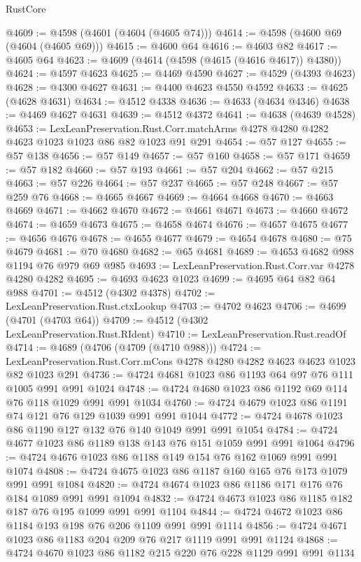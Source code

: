 \begin{lexlean}{RustCore}
\begin{coremodule}
@4609 := @4598 (@4601 (@4604 (@4605 @74)))
@4614 := @4598 (@4600 @69 (@4604 (@4605 @69)))
@4615 := @4600 @64
@4616 := @4603 @82
@4617 := @4605 @64
@4623 := @4609 (@4614 (@4598 (@4615 (@4616 @4617)) @4380))
@4624 := @4597 @4623
@4625 := @4469 @4590
@4627 := @4529 (@4393 @4623)
@4628 := @4300 @4627
@4631 := @4400 @4623 @4550 @4592
@4633 := @4625 (@4628 @4631)
@4634 := @4512 @4338
@4636 := @4633 (@4634 @4346)
@4638 := @4469 @4627 @4631
@4639 := @4512 @4372
@4641 := @4638 (@4639 @4528)
@4653 := LexLeanPreservation.Rust.Corr.matchArms
    @4278
    @4280
    @4282
    @4623
    @1023
    @1023
    @86
    @82
    @1023
    @91
    @291
@4654 := @57 @127
@4655 := @57 @138
@4656 := @57 @149
@4657 := @57 @160
@4658 := @57 @171
@4659 := @57 @182
@4660 := @57 @193
@4661 := @57 @204
@4662 := @57 @215
@4663 := @57 @226
@4664 := @57 @237
@4665 := @57 @248
@4667 := @57 @259 @76
@4668 := @4665 @4667
@4669 := @4664 @4668
@4670 := @4663 @4669
@4671 := @4662 @4670
@4672 := @4661 @4671
@4673 := @4660 @4672
@4674 := @4659 @4673
@4675 := @4658 @4674
@4676 := @4657 @4675
@4677 := @4656 @4676
@4678 := @4655 @4677
@4679 := @4654 @4678
@4680 := @75 @4679
@4681 := @70 @4680
@4682 := @65 @4681
@4689 := @4653 @4682 @988 @1194 @76 @979 @69 @985
@4693 := LexLeanPreservation.Rust.Corr.var @4278 @4280 @4282
@4695 := @4693 @4623 @1023
@4699 := @4695 @64 @82 @64 @988
@4701 := @4512 (@4302 @4378)
@4702 := LexLeanPreservation.Rust.ctxLookup
@4703 := @4702 @4623
@4706 := @4699 (@4701 (@4703 @64))
@4709 := @4512 (@4302 LexLeanPreservation.Rust.RIdent)
@4710 := LexLeanPreservation.Rust.readOf
@4714 := @4689 (@4706 (@4709 (@4710 @988)))
@4724 := LexLeanPreservation.Rust.Corr.mCons @4278 @4280 @4282 @4623 @4623 @1023 @82 @1023 @291
@4736 := @4724 @4681 @1023 @86 @1193 @64 @97 @76 @111 @1005 @991 @991 @1024
@4748 := @4724 @4680 @1023 @86 @1192 @69 @114 @76 @118 @1029 @991 @991 @1034
@4760 := @4724 @4679 @1023 @86 @1191 @74 @121 @76 @129 @1039 @991 @991 @1044
@4772 := @4724 @4678 @1023 @86 @1190 @127 @132 @76 @140 @1049 @991 @991 @1054
@4784 := @4724 @4677 @1023 @86 @1189 @138 @143 @76 @151 @1059 @991 @991 @1064
@4796 := @4724 @4676 @1023 @86 @1188 @149 @154 @76 @162 @1069 @991 @991 @1074
@4808 := @4724 @4675 @1023 @86 @1187 @160 @165 @76 @173 @1079 @991 @991 @1084
@4820 := @4724 @4674 @1023 @86 @1186 @171 @176 @76 @184 @1089 @991 @991 @1094
@4832 := @4724 @4673 @1023 @86 @1185 @182 @187 @76 @195 @1099 @991 @991 @1104
@4844 := @4724 @4672 @1023 @86 @1184 @193 @198 @76 @206 @1109 @991 @991 @1114
@4856 := @4724 @4671 @1023 @86 @1183 @204 @209 @76 @217 @1119 @991 @991 @1124
@4868 := @4724 @4670 @1023 @86 @1182 @215 @220 @76 @228 @1129 @991 @991 @1134

\end{coremodule}
\end{lexlean}
